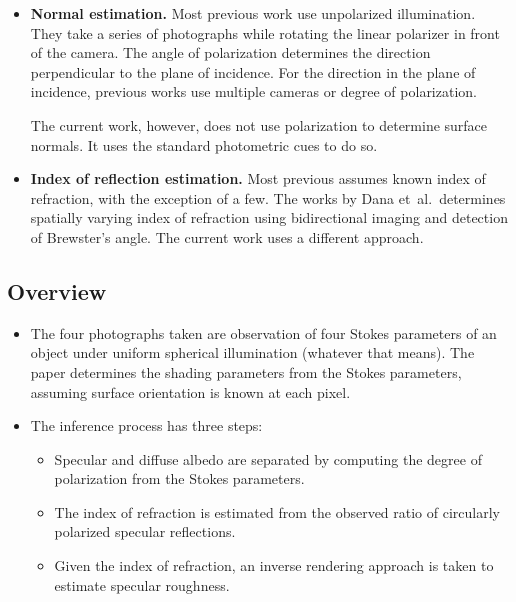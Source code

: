 \documentclass[10pt]{article}
\newcommand{\etal}{{et~al.}}
\begin{document}
\begin{itemize}
\begin{itemize}
        \item \textbf{Normal estimation.} Most previous work use unpolarized illumination.  They take a series of photographs while rotating the linear polarizer in front of the camera.  The angle of polarization determines the direction perpendicular to the plane of incidence.  For the direction in the plane of incidence, previous works use multiple cameras or degree of polarization.

        The current work, however, does not use polarization to determine surface normals.  It uses the standard photometric cues to do so.
        
        \item \textbf{Index of reflection estimation.} Most previous assumes known index of refraction, with the exception of a few.  The works by Dana \etal\ determines spatially varying index of refraction using bidirectional imaging and detection of Brewster's angle.  The current work uses a different approach.
    \end{itemize}
    \end{itemize}

    \subsection{Overview}

    \begin{itemize}
        \item The four photographs taken are observation of four Stokes parameters of an object under uniform spherical illumination (whatever that means).  The paper determines the shading parameters from the Stokes parameters, assuming surface orientation is known at each pixel.

        \item The inference process has three steps:
        \begin{itemize}
            \item Specular and diffuse albedo are separated by computing the degree of polarization from the Stokes parameters.
            \item The index of refraction is estimated from the observed ratio of circularly polarized specular reflections.
            \item Given the index of refraction, an inverse rendering approach is taken to estimate specular roughness.
        \end{itemize}         
    \end{itemize}
\end{document}
